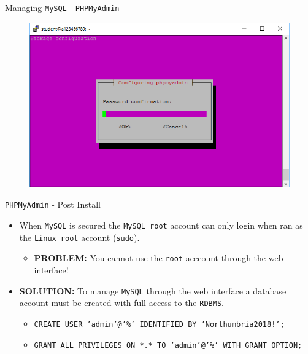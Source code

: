 \documentclass[xcolor=table]{beamer}
\begin{document}
\begin{frame}{Managing \texttt{MySQL} - \texttt{PHPMyAdmin}}
  \begin{figure}
    \begin{center}
      \includegraphics[width=1\linewidth]{MySQLInstall4.png}
    \end{center}
  \end{figure}
\end{frame}

\begin{frame}{\texttt{PHPMyAdmin} - Post Install}
  \begin{itemize}
    \item When \texttt{MySQL} is secured the \texttt{MySQL root} account can only login when ran as the \texttt{Linux root} account (\texttt{sudo}).
      \begin{itemize}
        \item \textbf{PROBLEM:} You cannot use the \texttt{root} acccount through the web interface!
      \end{itemize}
    \item \textbf{SOLUTION:} To manage \texttt{MySQL} through the web interface a database account must be created with full access to the \texttt{RDBMS}.
      \begin{itemize}
        \item \texttt{CREATE USER 'admin'@'\%' IDENTIFIED BY 'Northumbria2018!';}
        \item \texttt{GRANT ALL PRIVILEGES ON *.* TO 'admin'@'\%' WITH GRANT OPTION;}
      \end{itemize}
  \end{itemize}
\end{frame}
\end{document}
